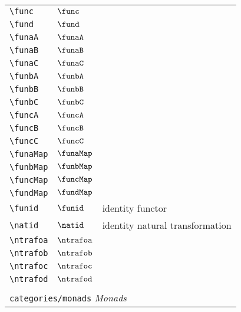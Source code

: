 \begin{longtable}{lll}
 {\color[rgb]{0.5,0.5,0.5}\texttt{\textbackslash func}} & $\func$ & \\ 
 {\color[rgb]{0.5,0.5,0.5}\texttt{\textbackslash fund}} & $\fund$ & \\ 
 {\color[rgb]{0.5,0.5,0.5}\texttt{\textbackslash funaA}} & $\funaA$ & \\ 
 {\color[rgb]{0.5,0.5,0.5}\texttt{\textbackslash funaB}} & $\funaB$ & \\ 
 {\color[rgb]{0.5,0.5,0.5}\texttt{\textbackslash funaC}} & $\funaC$ & \\ 
 {\color[rgb]{0.5,0.5,0.5}\texttt{\textbackslash funbA}} & $\funbA$ & \\ 
 {\color[rgb]{0.5,0.5,0.5}\texttt{\textbackslash funbB}} & $\funbB$ & \\ 
 {\color[rgb]{0.5,0.5,0.5}\texttt{\textbackslash funbC}} & $\funbC$ & \\ 
 {\color[rgb]{0.5,0.5,0.5}\texttt{\textbackslash funcA}} & $\funcA$ & \\ 
 {\color[rgb]{0.5,0.5,0.5}\texttt{\textbackslash funcB}} & $\funcB$ & \\ 
 {\color[rgb]{0.5,0.5,0.5}\texttt{\textbackslash funcC}} & $\funcC$ & \\ 
 {\color[rgb]{0.5,0.5,0.5}\texttt{\textbackslash funaMap}} & $\funaMap$ & \\ 
 {\color[rgb]{0.5,0.5,0.5}\texttt{\textbackslash funbMap}} & $\funbMap$ & \\ 
 {\color[rgb]{0.5,0.5,0.5}\texttt{\textbackslash funcMap}} & $\funcMap$ & \\ 
 {\color[rgb]{0.5,0.5,0.5}\texttt{\textbackslash fundMap}} & $\fundMap$ & \\ 
 {\color[rgb]{0.5,0.5,0.5}\texttt{\textbackslash funid}} & $\funid$ &  identity functor\\ 
 {\color[rgb]{0.5,0.5,0.5}\texttt{\textbackslash natid}} & $\natid$ &  identity natural transformation\\ 
 {\color[rgb]{0.5,0.5,0.5}\texttt{\textbackslash ntrafoa}} & $\ntrafoa$ & \\ 
 {\color[rgb]{0.5,0.5,0.5}\texttt{\textbackslash ntrafob}} & $\ntrafob$ & \\ 
 {\color[rgb]{0.5,0.5,0.5}\texttt{\textbackslash ntrafoc}} & $\ntrafoc$ & \\ 
 {\color[rgb]{0.5,0.5,0.5}\texttt{\textbackslash ntrafod}} & $\ntrafod$ & \\ 
  &  & \\ 
 \multicolumn{3}{l}{{\color[rgb]{0.5,0.5,0.5}\texttt{categories/monads}} \emph{Monads}}\\ 

\end{longtable}
